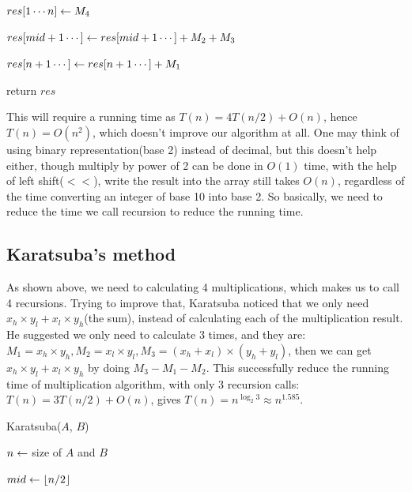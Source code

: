 \begin{spacing}{1.3}
\begin{algorithm}

        $res[1\cdots n]\leftarrow M_4$

        $res[mid+1\cdots ]\leftarrow res[mid+1\cdots] + M_2+M_3$

        $res[n+1\cdots]\leftarrow res[n+1\cdots]+M_1$

        return $res$
    \end{algorithm}

    This will require a running time as $T(n)=4T(n/2)+O(n)$, 
    hence $T(n)=O(n^2)$, which doesn't improve our algorithm 
    at all. One may think of using binary representation(base 2)
    instead of decimal, but this doesn't help either, 
    though multiply by power of 2 can be done in $O(1)$ time, 
    with the help of left shift($<<$), write the result into 
    the array still takes $O(n)$, regardless of the time 
    converting an integer of base 10 into base 2. 
    So basically, we need to reduce the time we call recursion 
    to reduce the running time.

    \subsection{Karatsuba's method}

    As shown above, we need to calculating 4 multiplications,
    which makes us to call 4 recursions. Trying to improve that, 
    Karatsuba noticed that we only need $x_h\times y_l+x_l\times y_h$(the sum),
    instead of calculating each of the multiplication result.
    He suggested we only need to calculate 3 times, and they are:
    $M_1=x_h\times y_h, M_2=x_l\times y_l, M_3=(x_h+x_l)\times 
    (y_h+y_l)$, then we can get $x_h\times y_l+x_l\times y_h$ 
    by doing $M_3-M_1-M_2$. This successfully reduce the 
    running time of multiplication algorithm, with only 3 
    recursion calls:
    $T(n)=3T(n/2)+O(n)$, gives $T(n)=n^{\log_2 3}\approx n^{1.585}$.

    \begin{algorithm}
        \caption{Karatsuba($A$, $B$)}

        $n\leftarrow $ size of $A$ and $B$


        $mid\leftarrow \lfloor n/2 \rfloor$


\end{algorithm}
\end{spacing}
